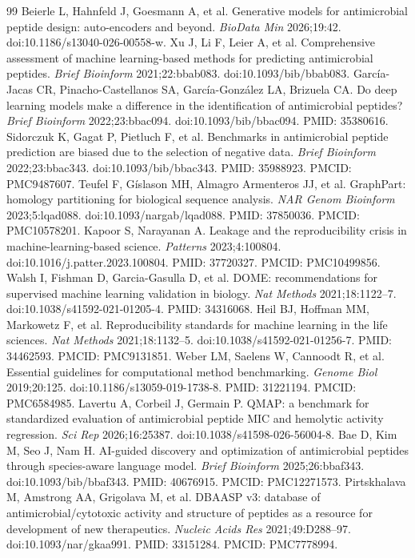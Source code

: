 \documentclass[unnumsec,webpdf,contemporary,large]{oup-authoring-template}
\begin{document}
\begin{thebibliography}{99}
 Beierle L, Hahnfeld J, Goesmann A, et al. Generative models for antimicrobial peptide design: auto-encoders and beyond. \textit{BioData Min} 2026;19:42. doi:10.1186/s13040-026-00558-w.
 Xu J, Li F, Leier A, et al. Comprehensive assessment of machine learning-based methods for predicting antimicrobial peptides. \textit{Brief Bioinform} 2021;22:bbab083. doi:10.1093/bib/bbab083.
 García-Jacas CR, Pinacho-Castellanos SA, García-González LA, Brizuela CA. Do deep learning models make a difference in the identification of antimicrobial peptides? \textit{Brief Bioinform} 2022;23:bbac094. doi:10.1093/bib/bbac094. PMID: 35380616.
 Sidorczuk K, Gagat P, Pietluch F, et al. Benchmarks in antimicrobial peptide prediction are biased due to the selection of negative data. \textit{Brief Bioinform} 2022;23:bbac343. doi:10.1093/bib/bbac343. PMID: 35988923. PMCID: PMC9487607.
 Teufel F, Gíslason MH, Almagro Armenteros JJ, et al. GraphPart: homology partitioning for biological sequence analysis. \textit{NAR Genom Bioinform} 2023;5:lqad088. doi:10.1093/nargab/lqad088. PMID: 37850036. PMCID: PMC10578201.
 Kapoor S, Narayanan A. Leakage and the reproducibility crisis in machine-learning-based science. \textit{Patterns} 2023;4:100804. doi:10.1016/j.patter.2023.100804. PMID: 37720327. PMCID: PMC10499856.
 Walsh I, Fishman D, Garcia-Gasulla D, et al. DOME: recommendations for supervised machine learning validation in biology. \textit{Nat Methods} 2021;18:1122--7. doi:10.1038/s41592-021-01205-4. PMID: 34316068.
 Heil BJ, Hoffman MM, Markowetz F, et al. Reproducibility standards for machine learning in the life sciences. \textit{Nat Methods} 2021;18:1132--5. doi:10.1038/s41592-021-01256-7. PMID: 34462593. PMCID: PMC9131851.
 Weber LM, Saelens W, Cannoodt R, et al. Essential guidelines for computational method benchmarking. \textit{Genome Biol} 2019;20:125. doi:10.1186/s13059-019-1738-8. PMID: 31221194. PMCID: PMC6584985.
 Lavertu A, Corbeil J, Germain P. QMAP: a benchmark for standardized evaluation of antimicrobial peptide MIC and hemolytic activity regression. \textit{Sci Rep} 2026;16:25387. doi:10.1038/s41598-026-56004-8.
 Bae D, Kim M, Seo J, Nam H. AI-guided discovery and optimization of antimicrobial peptides through species-aware language model. \textit{Brief Bioinform} 2025;26:bbaf343. doi:10.1093/bib/bbaf343. PMID: 40676915. PMCID: PMC12271573.
 Pirtskhalava M, Amstrong AA, Grigolava M, et al. DBAASP v3: database of antimicrobial/cytotoxic activity and structure of peptides as a resource for development of new therapeutics. \textit{Nucleic Acids Res} 2021;49:D288--97. doi:10.1093/nar/gkaa991. PMID: 33151284. PMCID: PMC7778994.

\end{thebibliography}
\end{document}
